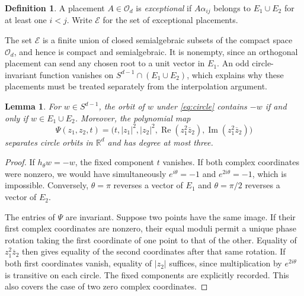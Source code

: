 \documentclass[11pt,reqno]{amsart}
\newtheorem{lemma}[lemma]{Lemma}
\theoremstyle{definition}
\newtheorem{definition}[definition]{Definition}
\theoremstyle{remark}
\numberwithin{equation}{section}
\newcommand{\R}{\mathbb R}
\newcommand{\Orth}{\mathcal O_d}
\newcommand{\Exc}{\mathcal E}
\DeclareMathOperator{\RePart}{Re}
\DeclareMathOperator{\ImPart}{Im}
\begin{document}
\begin{definition}\label{def:exceptional}
A placement $A\in\Orth$ is \emph{exceptional} if $A\alpha_{ij}$
belongs to $E_1\cup E_2$ for at least one $i<j$. Write $\Exc$ for
the set of exceptional placements.
\end{definition}

The set $\Exc$ is a finite union of closed semialgebraic subsets of
the compact space $\Orth$, and hence is compact and semialgebraic.
It is nonempty, since an orthogonal placement can send any chosen root
to a unit vector in $E_1$. An odd circle-invariant function vanishes on
$S^{d-1}\cap(E_1\cup E_2)$, which explains why these placements must
be treated separately from the interpolation argument.

\begin{lemma}\label{lem:orbits}
For $w\in S^{d-1}$, the orbit of $w$ under \eqref{eq:circle} contains
$-w$ if and only if $w\in E_1\cup E_2$.
Moreover, the polynomial map
\begin{equation}\label{eq:orbit-map}
 \Psi(z_1,z_2,t)=
 \bigl(t,|z_1|^2,|z_2|^2,
        \RePart(z_1^2\overline z_2),
        \ImPart(z_1^2\overline z_2)\bigr)
\end{equation}
separates circle orbits in $\R^d$ and has degree at most three.
\end{lemma}
\begin{proof}
If $h_\theta w=-w$, the fixed component $t$ vanishes. If both complex
coordinates were nonzero, we would have simultaneously
$e^{i\theta}=-1$ and $e^{2i\theta}=-1$, which is impossible.
Conversely, $\theta=\pi$ reverses a vector of $E_1$ and
$\theta=\pi/2$ reverses a vector of $E_2$.

The entries of $\Psi$ are invariant. Suppose two points have the same
image. If their first complex coordinates are nonzero, their equal
moduli permit a unique phase rotation taking the first coordinate of
one point to that of the other. Equality of $z_1^2\overline z_2$
then gives equality of the second coordinates after that same
rotation. If both first coordinates vanish, equality of $|z_2|$
suffices, since multiplication by $e^{2i\theta}$ is transitive on
each circle. The fixed components are explicitly recorded. This
also covers the case of two zero complex coordinates.
\end{proof}
\end{document}
